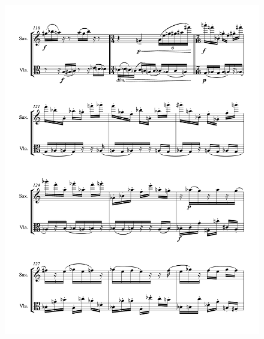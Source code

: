 \begin{figure}[htbp]
    \centering
	\includegraphics[width=6.5in]{figures/Sax_Viola_11.pdf}
\end{figure}

